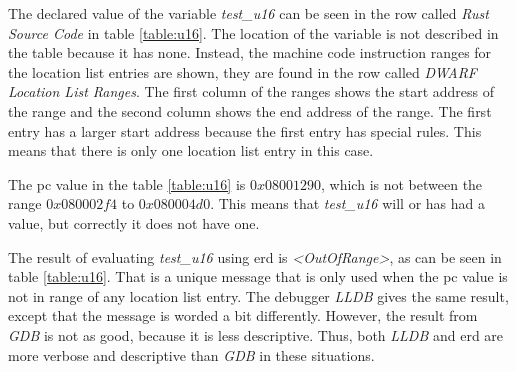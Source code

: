 The declared value of the variable \emph{test\_u16} can be seen in the row called \emph{Rust Source Code} in table \ref{table:u16}.
The location of the variable is not described in the table because it has none.
Instead, the machine code instruction ranges for the location list entries are shown, they are found in the row called \emph{DWARF Location List Ranges}.
The first column of the ranges shows the start address of the range and the second column shows the end address of the range.
The first  entry has a larger start address because the first entry has special rules.
This means that there is only one location list entry in this case.


The \gls{pc} value in the table \ref{table:u16} is $0x08001290$, which is not between the range $0x080002f4$ to $0x080004d0$.
This means that \emph{test\_u16} will or has had a value, but correctly it does not have one.


The result of evaluating \emph{test\_u16} using \gls{erd} is \emph{\textless OutOfRange\textgreater}, as can be seen in table \ref{table:u16}.
That is a unique message that is only used when the \gls{pc} value is not in range of any location list entry.
The debugger \emph{LLDB} gives the same result, except that the message is worded a bit differently.
However, the result from \emph{GDB} is not as good, because it is less descriptive.
Thus, both \emph{LLDB} and \gls{erd} are more verbose and descriptive than \emph{GDB} in these situations.

